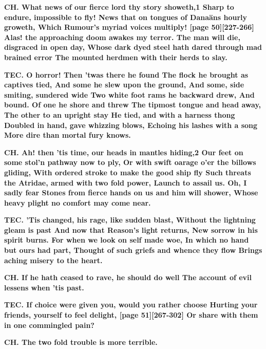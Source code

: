 \documentclass[11pt,letter]{book}
\begin{document}
\par \textbf{CH. What news of our fierce lord thy story showeth,1 Sharp to endure, impossible to fly! News that on tongues of Danaäns hourly groweth, Which Rumour’s myriad voices multiply! [page 50][227-266] Alas! the approaching doom awakes my terror. The man will die, disgraced in open day, Whose dark dyed steel hath dared through mad brained error The mounted herdmen with their herds to slay.}
\par 

\par \textbf{TEC. O horror! Then ’twas there he found The flock he brought as captives tied, And some he slew upon the ground, And some, side smiting, sundered wide Two white foot rams he backward drew, And bound. Of one he shore and threw The tipmost tongue and head away, The other to an upright stay He tied, and with a harness thong Doubled in hand, gave whizzing blows, Echoing his lashes with a song More dire than mortal fury knows.}
\par 

\par \textbf{CH. Ah! then ’tis time, our heads in mantles hiding,2 Our feet on some stol’n pathway now to ply, Or with swift oarage o’er the billows gliding, With ordered stroke to make the good ship fly Such threats the Atridae, armed with two fold power, Launch to assail us. Oh, I sadly fear Stones from fierce hands on us and him will shower, Whose heavy plight no comfort may come near.}
\par 

\par \textbf{TEC. ’Tis changed, his rage, like sudden blast, Without the lightning gleam is past And now that Reason’s light returns, New sorrow in his spirit burns. For when we look on self made woe, In which no hand but ours had part, Thought of such griefs and whence they flow Brings aching misery to the heart.}
\par 

\par \textbf{CH. If he hath ceased to rave, he should do well The account of evil lessens when ’tis past.}
\par 

\par \textbf{TEC. If choice were given you, would you rather choose Hurting your friends, yourself to feel delight, [page 51][267-302] Or share with them in one commingled pain?}
\par 

\par \textbf{CH. The two fold trouble is more terrible.}
\par 
\end{document}
